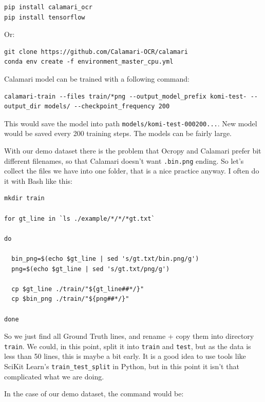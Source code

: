 \documentclass[]{book}
\begin{document}
\begin{verbatim}
pip install calamari_ocr
pip install tensorflow 
\end{verbatim}

Or:

\begin{verbatim}
git clone https://github.com/Calamari-OCR/calamari
conda env create -f environment_master_cpu.yml
\end{verbatim}

Calamari model can be trained with a following command:

\begin{verbatim}
calamari-train --files train/*png --output_model_prefix komi-test- --output_dir models/ --checkpoint_frequency 200
\end{verbatim}

This would save the model into path \texttt{models/komi-test-000200...}. New model would be saved every 200 training steps. The models can be fairly large.

With our demo dataset there is the problem that Ocropy and Calamari prefer bit different filenames, so that Calamari doesn't want \texttt{.bin.png} ending. So let's collect the files we have into one folder, that is a nice practice anyway. I often do it with Bash like this:

\begin{verbatim}
mkdir train

for gt_line in `ls ./example/*/*/*gt.txt`

do

  bin_png=$(echo $gt_line | sed 's/gt.txt/bin.png/g')
  png=$(echo $gt_line | sed 's/gt.txt/png/g')

  cp $gt_line ./train/"${gt_line##*/}"
  cp $bin_png ./train/"${png##*/}"

done
\end{verbatim}

So we just find all Ground Truth lines, and rename + copy them into directory \texttt{train}. We could, in this point, split it into \texttt{train} and \texttt{test}, but as the data is less than 50 lines, this is maybe a bit early. It is a good idea to use tools like SciKit Learn's \texttt{train\_test\_split} in Python, but in this point it isn't that complicated what we are doing.

In the case of our demo dataset, the command would be:
\end{document}
